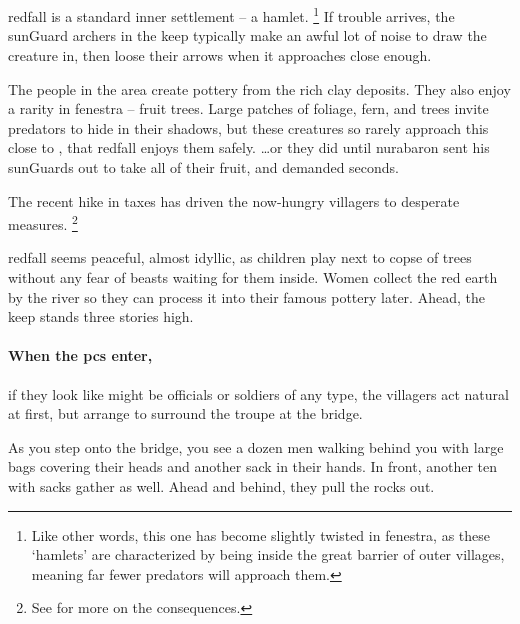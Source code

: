 \section{}
\label{redfallVillage}
\begin{multicols}{2}

\Gls{redfall} is a standard inner settlement -- a hamlet.%
\footnote{Like other words, this one has become slightly twisted in \gls{fenestra}, as these `hamlets' are characterized by being inside the great barrier of outer \glspl{village}, meaning far fewer predators will approach them.}
If trouble arrives, the \gls{sunGuard} archers in the keep typically make an awful lot of noise to draw the creature in, then loose their arrows when it approaches close enough.


The people in the area create pottery from the rich clay deposits.
They also enjoy a rarity in \gls{fenestra} -- fruit trees.
Large patches of foliage, fern, and trees invite predators to hide in their shadows, but these creatures so rarely approach this close to , that \gls{redfall} enjoys them safely.
\ldots or they did until \gls{nurabaron} sent his \glspl{sunGuard} out to take all of their fruit, and demanded seconds.

The recent hike in taxes has driven the now-hungry villagers to desperate measures.%
\footnote{See  for more on the consequences.}

\begin{boxtext}
  \Gls{redfall} seems peaceful, almost idyllic, as children play next to copse of trees without any fear of beasts waiting for them inside.
  Women collect the red earth by the river so they can process it into their famous pottery later.
  Ahead, the keep stands three stories high.
\end{boxtext}

\paragraph{When the \glspl{pc} enter,}
if they look like might be officials or soldiers of any type, the villagers act natural at first, but arrange to surround the troupe at the bridge.

\begin{boxtext}
  As you step onto the bridge, you see a dozen men walking behind you with large bags covering their heads and another sack in their hands.
  In front, another ten with sacks gather as well.
  Ahead and behind, they pull the rocks out.


\end{boxtext}
\end{multicols}
